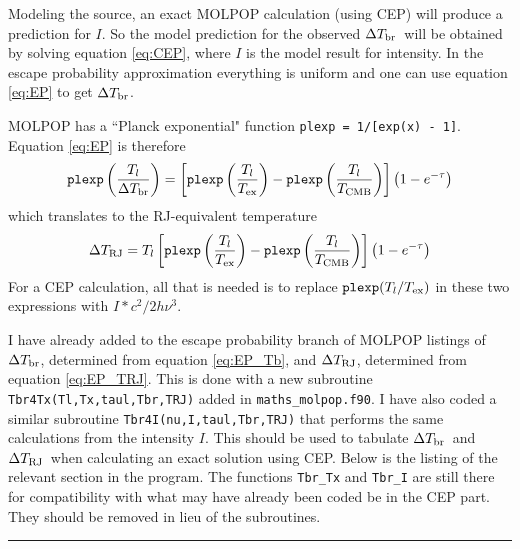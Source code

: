 \documentclass[preprint,12pt]{aastex}
\def\eq#1{\begin{equation} #1 \end{equation}}
\def\Tcmb     {\hbox{$T_{\rm CMB}$}}
\def\TRJ      {\hbox{$T_{\rm RJ}$}}
\def\Tbr      {\hbox{$\Delta T_{\rm br}$}}
\def\TRJ      {\hbox{$\Delta T_{\rm RJ}$}}
\def\Tx       {\hbox{$T_{\rm ex}$}}
\begin{document}
Modeling the source, an exact MOLPOP calculation (using CEP) will produce a
prediction for $I$. So the model prediction for the observed \Tbr\ will be
obtained by solving equation \ref{eq:CEP}, where $I$ is the model result for
intensity. In the escape probability approximation everything is uniform and
one can use equation \ref{eq:EP} to get \Tbr.

MOLPOP has a ``Planck exponential" function {\tt plexp = 1/[exp(x) - 1]}.
Equation \ref{eq:EP} is therefore
\eq{\label{eq:EP_Tb}
   {\tt plexp}\left({T_l\over\Tbr}\right) =
   \left[{\tt plexp}\left({T_l\over\Tx}\right)
   - {\tt plexp}\left({T_l\over\Tcmb}\right)\right]
   \left(1 -  e^{-\tau}\right)
}
which translates to the RJ-equivalent temperature
\eq{\label{eq:EP_TRJ}
   \TRJ = T_l
   \left[{\tt plexp}\left({T_l\over\Tx}\right)
   - {\tt plexp}\left({T_l\over\Tcmb}\right)\right]
   \left(1 -  e^{-\tau}\right)
}
For a CEP calculation, all that is needed is to replace ${\tt plexp}(T_l/\Tx)$
in these two expressions with $I*c^2/2h\nu^3$.


I have already added to the escape probability branch of MOLPOP listings of
\Tbr, determined from equation \ref{eq:EP_Tb}, and \TRJ, determined from
equation \ref{eq:EP_TRJ}. This is done with a new subroutine {\tt
Tbr4Tx(Tl,Tx,taul,Tbr,TRJ)} added in {\tt maths\_molpop.f90}. I have also coded
a similar subroutine {\tt Tbr4I(nu,I,taul,Tbr,TRJ)} that performs the same
calculations from the intensity $I$. This should be used to tabulate \Tbr\ and
\TRJ\ when calculating an exact solution using CEP. Below is the listing of the
relevant section in the program. The functions {\tt Tbr\_Tx} and {\tt Tbr\_I}
are still there for compatibility with what may have already been coded be in
the CEP part. They should be removed in lieu of the subroutines.



\bigskip \noindent\rule{\hsize}{.5pt} \bigskip
\end{document}
